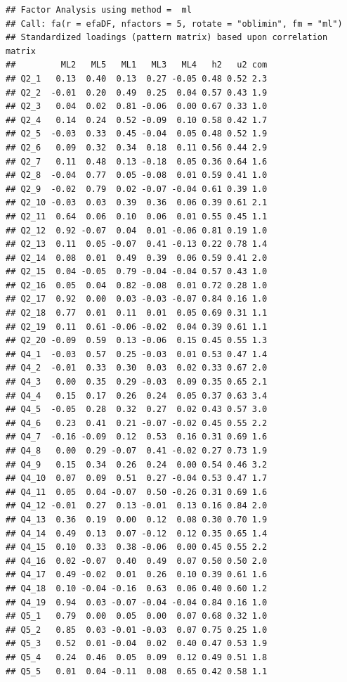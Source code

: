 \documentclass[
  man]{apa6}
\begin{document}
\begin{verbatim}
## Factor Analysis using method =  ml
## Call: fa(r = efaDF, nfactors = 5, rotate = "oblimin", fm = "ml")
## Standardized loadings (pattern matrix) based upon correlation matrix
##         ML2   ML5   ML1   ML3   ML4   h2   u2 com
## Q2_1   0.13  0.40  0.13  0.27 -0.05 0.48 0.52 2.3
## Q2_2  -0.01  0.20  0.49  0.25  0.04 0.57 0.43 1.9
## Q2_3   0.04  0.02  0.81 -0.06  0.00 0.67 0.33 1.0
## Q2_4   0.14  0.24  0.52 -0.09  0.10 0.58 0.42 1.7
## Q2_5  -0.03  0.33  0.45 -0.04  0.05 0.48 0.52 1.9
## Q2_6   0.09  0.32  0.34  0.18  0.11 0.56 0.44 2.9
## Q2_7   0.11  0.48  0.13 -0.18  0.05 0.36 0.64 1.6
## Q2_8  -0.04  0.77  0.05 -0.08  0.01 0.59 0.41 1.0
## Q2_9  -0.02  0.79  0.02 -0.07 -0.04 0.61 0.39 1.0
## Q2_10 -0.03  0.03  0.39  0.36  0.06 0.39 0.61 2.1
## Q2_11  0.64  0.06  0.10  0.06  0.01 0.55 0.45 1.1
## Q2_12  0.92 -0.07  0.04  0.01 -0.06 0.81 0.19 1.0
## Q2_13  0.11  0.05 -0.07  0.41 -0.13 0.22 0.78 1.4
## Q2_14  0.08  0.01  0.49  0.39  0.06 0.59 0.41 2.0
## Q2_15  0.04 -0.05  0.79 -0.04 -0.04 0.57 0.43 1.0
## Q2_16  0.05  0.04  0.82 -0.08  0.01 0.72 0.28 1.0
## Q2_17  0.92  0.00  0.03 -0.03 -0.07 0.84 0.16 1.0
## Q2_18  0.77  0.01  0.11  0.01  0.05 0.69 0.31 1.1
## Q2_19  0.11  0.61 -0.06 -0.02  0.04 0.39 0.61 1.1
## Q2_20 -0.09  0.59  0.13 -0.06  0.15 0.45 0.55 1.3
## Q4_1  -0.03  0.57  0.25 -0.03  0.01 0.53 0.47 1.4
## Q4_2  -0.01  0.33  0.30  0.03  0.02 0.33 0.67 2.0
## Q4_3   0.00  0.35  0.29 -0.03  0.09 0.35 0.65 2.1
## Q4_4   0.15  0.17  0.26  0.24  0.05 0.37 0.63 3.4
## Q4_5  -0.05  0.28  0.32  0.27  0.02 0.43 0.57 3.0
## Q4_6   0.23  0.41  0.21 -0.07 -0.02 0.45 0.55 2.2
## Q4_7  -0.16 -0.09  0.12  0.53  0.16 0.31 0.69 1.6
## Q4_8   0.00  0.29 -0.07  0.41 -0.02 0.27 0.73 1.9
## Q4_9   0.15  0.34  0.26  0.24  0.00 0.54 0.46 3.2
## Q4_10  0.07  0.09  0.51  0.27 -0.04 0.53 0.47 1.7
## Q4_11  0.05  0.04 -0.07  0.50 -0.26 0.31 0.69 1.6
## Q4_12 -0.01  0.27  0.13 -0.01  0.13 0.16 0.84 2.0
## Q4_13  0.36  0.19  0.00  0.12  0.08 0.30 0.70 1.9
## Q4_14  0.49  0.13  0.07 -0.12  0.12 0.35 0.65 1.4
## Q4_15  0.10  0.33  0.38 -0.06  0.00 0.45 0.55 2.2
## Q4_16  0.02 -0.07  0.40  0.49  0.07 0.50 0.50 2.0
## Q4_17  0.49 -0.02  0.01  0.26  0.10 0.39 0.61 1.6
## Q4_18  0.10 -0.04 -0.16  0.63  0.06 0.40 0.60 1.2
## Q4_19  0.94  0.03 -0.07 -0.04 -0.04 0.84 0.16 1.0
## Q5_1   0.79  0.00  0.05  0.00  0.07 0.68 0.32 1.0
## Q5_2   0.85  0.03 -0.01 -0.03  0.07 0.75 0.25 1.0
## Q5_3   0.52  0.01 -0.04  0.02  0.40 0.47 0.53 1.9
## Q5_4   0.24  0.46  0.05  0.09  0.12 0.49 0.51 1.8
## Q5_5   0.01  0.04 -0.11  0.08  0.65 0.42 0.58 1.1

\end{verbatim}
\end{document}
